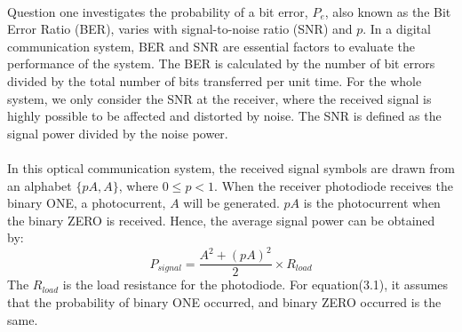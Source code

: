 \documentclass[12pt]{article}
\begin{document}
    \paragraph{}
    Question one investigates the probability of a bit error, $P_e$, also known as the Bit Error Ratio (BER), varies with signal-to-noise ratio (SNR) and $p$. In a digital communication system, BER and SNR are essential factors to evaluate the performance of the system. The BER is calculated by the number of bit errors divided by the total number of bits transferred per unit time. For the whole system, we only consider the SNR at the receiver, where the received signal is highly possible to be affected and distorted by noise. The SNR is defined as the signal power divided by the noise power.
    
    \paragraph{}
    In this optical communication system, the received signal symbols are drawn from an alphabet $\{pA, A\}$, where $0 \leq p < 1$. When the receiver photodiode receives the binary ONE, a photocurrent, $A$ will be generated. $pA$ is the photocurrent when the binary ZERO is received. Hence, the average signal power can be obtained by:
    \begin{equation}
        P_{signal}=\frac{A^2+(pA)^2}{2}\times R_{load}
    \end{equation}
    The $R_{load}$ is the load resistance for the photodiode. For equation(3.1), it assumes that the probability of binary ONE occurred, and binary ZERO occurred is the same.
\end{document}
